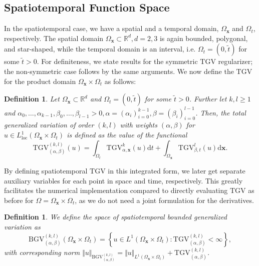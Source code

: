 \documentclass{article}
\newcommand{\dx}{\mathrm{d}}
\newcommand{\R}{\mathbb{R}}
\newcommand{\TGV}{\mathrm{TGV}}
\newcommand{\BGV}{\mathrm{BGV}}
\newcommand{\OmegaSpace}{\Omega_\mathbf{x}}
\newcommand{\OmegaTime}{\Omega_t}
\newtheorem{definition}[theorem]{Definition}
\begin{document}
	\subsection{Spatiotemporal Function Space}
	In the spatiotemporal case, we have a spatial and a temporal domain, $\OmegaSpace$ and $\OmegaTime$, respectively.
	The spatial domain  $\OmegaSpace\subset \R^d, d=2, 3$ is again bounded, polygonal, and star-shaped, while the temporal domain is an interval, i.e. $\OmegaTime = (0, \tilde{t})$ for some $\tilde{t} > 0$.
	For definiteness, we state results for the symmetric $\TGV$ regularizer; the non-symmetric case follows by the same arguments.
	We now define the $\TGV$ for the product domain $\OmegaSpace \times \OmegaTime$ as follows:
	\begin{definition}
		\label{def:ContTgv}
		Let $\OmegaSpace \subset \R^d$ and $\OmegaTime = (0, \tilde{t})$ for some $\tilde{t} > 0$.
		Further let $k,l \geq 1$ and $\alpha_0, \ldots, \alpha_{k-1}, \beta_0, \ldots, \beta_{l-1} > 0, \alpha = (\alpha_i)_{i=0}^{k-1}, \beta = (\beta_i)_{i=0}^{l-1}$. Then, the \emph{total generalized variation} of order $(k,l)$ with weights $(\alpha, \beta)$ for $u \in L^1_\text{loc}(\OmegaSpace \times \OmegaTime)$ is defined as the value of the functional
		\begin{equation*}
			\TGV_{(\alpha, \beta)}^{(k,l)}(u) =  \int_{\OmegaTime} \TGV_{\alpha, \mathbf{x}}^k(u) \dx t + \int_{\OmegaSpace} \TGV_{\beta, t}^l(u)\dx\mathbf{x}.
		\end{equation*}
	\end{definition}
	By defining spatiotemporal $\TGV$ in this integrated form, we later get separate auxiliary variables for each point in space and time, respectively.
	This greatly facilitates the numerical implementation compared to directly evaluating $\TGV$ as before for $\Omega = \OmegaSpace\times\OmegaTime$, as we do not need a joint formulation for the derivatives. 
	\begin{definition}
		We define the space of spatiotemporal bounded generalized variation as 
		\begin{equation*}
			\BGV_{(\alpha, \beta)}^{(k,l)}(\OmegaSpace \times \OmegaTime) = \left\lbrace u \in  L^1(\OmegaSpace \times \OmegaTime) \colon \TGV_{(\alpha, \beta)}^{(k,l)} < \infty\right\rbrace, 
		\end{equation*}
		with corresponding norm $\Vert  u\Vert _{\BGV_{(\alpha, \beta)}^{(k,l)}} = \Vert u\Vert _{L^1(\OmegaSpace \times \OmegaTime)}+ \TGV_{(\alpha, \beta)}^{(k,l)}$.
	\end{definition}
\end{document}
